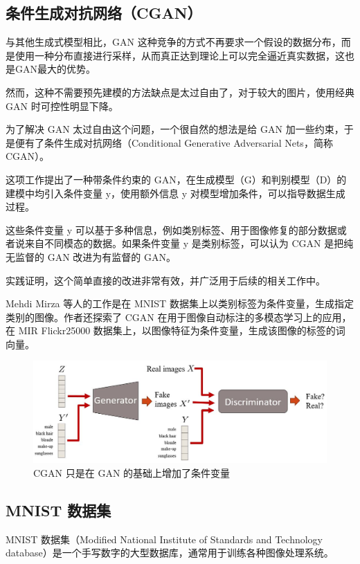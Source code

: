 \documentclass[a4paper, 12pt]{article}
\begin{document}
\subsection{条件生成对抗网络（CGAN）}

与其他生成式模型相比，GAN 这种竞争的方式不再要求一个假设的数据分布，而是使用一种分布直接进行采样，从而真正达到理论上可以完全逼近真实数据，这也是GAN最大的优势。

然而，这种不需要预先建模的方法缺点是太过自由了，对于较大的图片，使用经典 GAN 时可控性明显下降。

为了解决 GAN 太过自由这个问题，一个很自然的想法是给 GAN 加一些约束，于是便有了条件生成对抗网络（Conditional Generative Adversarial Nets，简称 CGAN）。

这项工作提出了一种带条件约束的 GAN，在生成模型（G）和判别模型（D）的建模中均引入条件变量 y，使用额外信息 y 对模型增加条件，可以指导数据生成过程。

这些条件变量 y 可以基于多种信息，例如类别标签、用于图像修复的部分数据或者说来自不同模态的数据。如果条件变量 y 是类别标签，可以认为 CGAN 是把纯无监督的 GAN 改进为有监督的 GAN。

实践证明，这个简单直接的改进非常有效，并广泛用于后续的相关工作中。

Mehdi Mirza 等人的工作是在 MNIST 数据集上以类别标签为条件变量，生成指定类别的图像。作者还探索了 CGAN 在用于图像自动标注的多模态学习上的应用，在 MIR Flickr25000 数据集上，以图像特征为条件变量，生成该图像的标签的词向量。

\begin{figure}[htbp]
\centering
\includegraphics[width=\textwidth]{images/cgan_structure.jpg}
\caption{CGAN 只是在 GAN 的基础上增加了条件变量}
\end{figure}

\subsection{MNIST 数据集}
MNIST 数据集（Modified National Institute of Standards and Technology database）是一个手写数字的大型数据库，通常用于训练各种图像处理系统。
\end{document}

